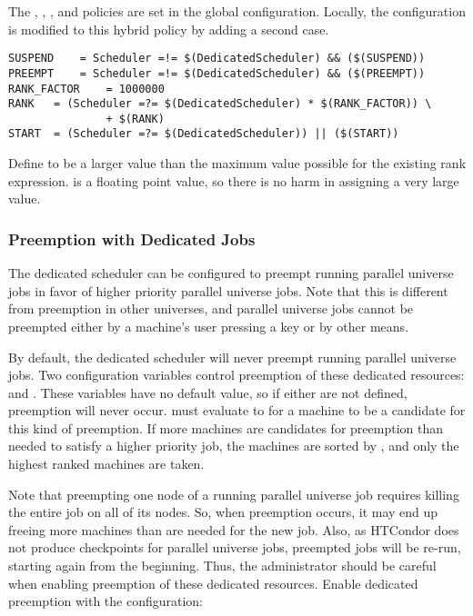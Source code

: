 \begin{description}
The , , , and
 policies are set in the global configuration.
Locally, the configuration is modified to this hybrid policy
by adding a second case.

\begin{verbatim}
SUSPEND    = Scheduler =!= $(DedicatedScheduler) && ($(SUSPEND))
PREEMPT    = Scheduler =!= $(DedicatedScheduler) && ($(PREEMPT))
RANK_FACTOR    = 1000000
RANK   = (Scheduler =?= $(DedicatedScheduler) * $(RANK_FACTOR)) \
               + $(RANK)
START  = (Scheduler =?= $(DedicatedScheduler)) || ($(START))
\end{verbatim}

Define  to be a
larger value than the maximum value possible for the existing rank expression.
\Macro{RANK} is a floating point value, so there is no harm in
assigning a very large value. 

\end{description}

\subsubsection{\label{sec:Configure-Dedicated-Preemption}
Preemption with Dedicated Jobs}

The dedicated scheduler can be configured to preempt running parallel
universe jobs in favor of higher priority parallel universe jobs.
Note that this is
different from preemption in other universes, and parallel universe
jobs cannot
be preempted either by a machine's user pressing a key or by other means.

By default, the dedicated scheduler will never preempt running 
parallel universe jobs.
Two configuration variables control preemption of these dedicated 
resources: 
 and .
These variables have no default value, 
so if either are not defined, preemption will never occur. 
 must evaluate to 
for a machine to be a candidate for this kind of preemption.
If more machines are 
candidates for preemption than needed to satisfy a higher priority job, the
machines are sorted by \MacroNI{SCHEDD\_PREEMPTION\_RANK}, and
only the highest ranked machines are taken.

Note that preempting one node of a running parallel universe job 
requires killing the entire job on all of its nodes.  
So, when preemption occurs, 
it may end up freeing more machines than are needed for the new job.
Also, as HTCondor does not produce checkpoints for parallel universe jobs,
preempted jobs will be re-run, starting again from the beginning.
Thus, the administrator should be careful when
enabling preemption of these dedicated resources.
Enable dedicated preemption with the configuration:

